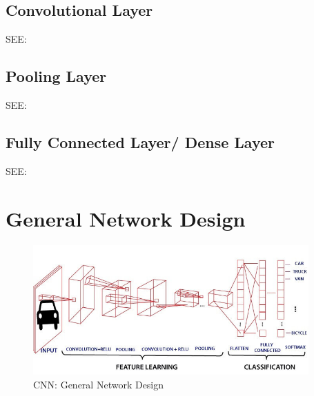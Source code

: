 \subsection{Convolutional Layer}

SEE: 


\subsection{Pooling Layer}

SEE: 


\subsection{Fully Connected Layer/ Dense Layer}
SEE: 





\section{General Network Design \cite{gfg-convolutional-neural-network-cnn-in-machine-learning,dnn-1}}\label{cnn: General Network Design}

\begin{figure}[h]
    \centering
    \includegraphics[width=\linewidth, height=5cm, keepaspectratio]{Pictures/convolutional-neural-network/convolutional-neural-network.jpg}
    \caption{CNN: General Network Design}
\end{figure}

